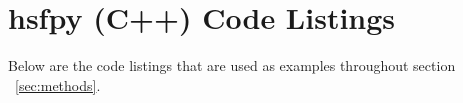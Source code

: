 \section{hsfpy (C++) Code Listings} \label{app:code}

  Below are the code listings that are used as examples throughout section ~\ref{sec:methods}.

  
  
  \mainstretch{}
